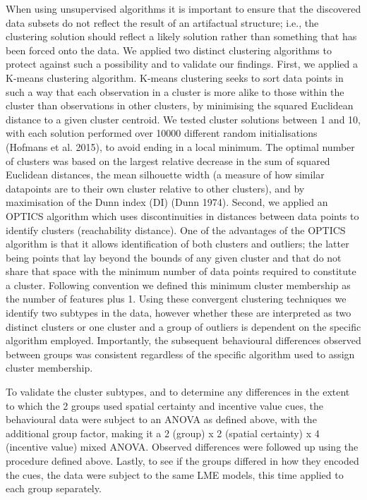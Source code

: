 \documentclass[11pt,halfline,a4paper,]{ouparticle}
\begin{document}
When using unsupervised algorithms it is important to ensure that the discovered data subsets do not reflect the result of an artifactual structure; i.e., the clustering solution should reflect a likely solution rather than something that has been forced onto the data. We applied two distinct clustering algorithms to protect against such a possibility and to validate our findings. First, we applied a K-means clustering algorithm. K-means clustering seeks to sort data points in such a way that each observation in a cluster is more alike to those within the cluster than observations in other clusters, by minimising the squared Euclidean distance to a given cluster centroid. We tested cluster solutions between 1 and 10, with each solution performed over 10000 different random initialisations (Hofmans et al. 2015), to avoid ending in a local minimum. The optimal number of clusters was based on the largest relative decrease in the sum of squared Euclidean distances, the mean silhouette width (a measure of how similar datapoints are to their own cluster relative to other clusters), and by maximisation of the Dunn index (DI) (Dunn 1974). Second, we applied an OPTICS algorithm which uses discontinuities in distances between data points to identify clusters (reachability distance). One of the advantages of the OPTICS algorithm is that it allows identification of both clusters and outliers; the latter being points that lay beyond the bounds of any given cluster and that do not share that space with the minimum number of data points required to constitute a cluster. Following convention we defined this minimum cluster membership as the number of features plus 1. Using these convergent clustering techniques we identify two subtypes in the data, however whether these are interpreted as two distinct clusters or one cluster and a group of outliers is dependent on the specific algorithm employed. Importantly, the subsequent behavioural differences observed between groups was consistent regardless of the specific algorithm used to assign cluster membership.

To validate the cluster subtypes, and to determine any differences in the extent to which the 2 groups used spatial certainty and incentive value cues, the behavioural data were subject to an ANOVA as defined above, with the additional group factor, making it a 2 (group) x 2 (spatial certainty) x 4 (incentive value) mixed ANOVA. Observed differences were followed up using the procedure defined above. Lastly, to see if the groups differed in how they encoded the cues, the data were subject to the same LME models, this time applied to each group separately.
\end{document}
